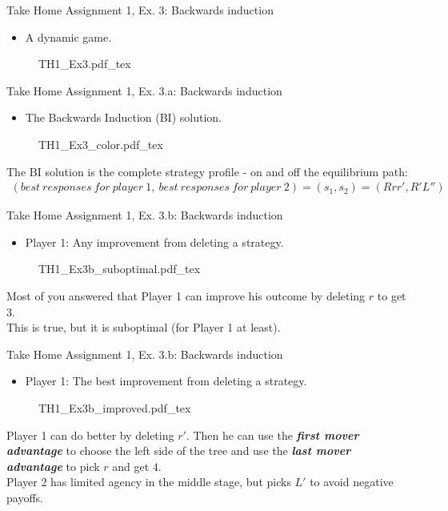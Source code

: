 \begin{frame}{Take Home Assignment 1, Ex. 3: Backwards induction}
  \begin{itemize}
    \item[3.] A dynamic game.
  \end{itemize}
  \begin{figure}[!h]
    \center
    \def\svgwidth{\columnwidth}
    {TH1_Ex3.pdf_tex}
  \end{figure}
\end{frame}
\begin{frame}{Take Home Assignment 1, Ex. 3.a: Backwards induction}
  \begin{itemize}
    \item[(3a)] The Backwards Induction (BI) solution.
  \end{itemize}
  \begin{figure}[!h]
    \center
    \def\svgwidth{\columnwidth}
    {TH1_Ex3_color.pdf_tex}
  \end{figure}
  The BI solution is the complete strategy profile - on and off the equilibrium path:
  \begin{align*}
    (best\ responses\ for\ player\ 1,\ best\ responses\ for\ player\ 2)=(s_1,s_2)=(Rrr',R'L'')
  \end{align*}
\end{frame}
\begin{frame}{Take Home Assignment 1, Ex. 3.b: Backwards induction}
  \begin{itemize}
    \item[(3b)] Player 1: Any improvement from deleting a strategy.
  \end{itemize}
  \begin{figure}[!h]
    \center
    \def\svgwidth{\columnwidth}
    {TH1_Ex3b_suboptimal.pdf_tex}
  \end{figure}
  Most of you answered that Player 1 can improve his outcome by deleting $r$ to get 3.\\\medskip
  This is true, but it is suboptimal (for Player 1 at least).
\end{frame}
\begin{frame}{Take Home Assignment 1, Ex. 3.b: Backwards induction}
  \begin{itemize}
    \item[(3b)] Player 1: The best improvement from deleting a strategy.
  \end{itemize}
  \begin{figure}[!h]
    \center
    \def\svgwidth{\columnwidth}
    {TH1_Ex3b_improved.pdf_tex}
  \end{figure}
  Player 1 can do better by deleting $r'$. Then he can use the \textit{\textbf{first mover advantage}} to choose the left side of the tree and use the \textit{\textbf{last mover advantage}} to pick $r$ and get $4$.\\\medskip
  Player 2 has limited agency in the middle stage, but picks $L'$ to avoid negative payoffs.
\end{frame}
